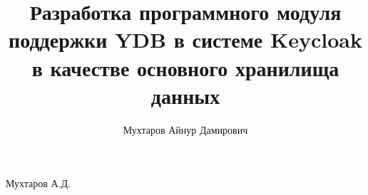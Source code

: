 \documentclass[times]{itmo-student-thesis}
\begin{document}
\title{Разработка программного модуля поддержки YDB в системе Keycloak в качестве основного хранилища данных}
\author{Мухтаров Айнур Дамирович}{Мухтаров А.Д.}
\startdate{}{}{}
\startdate{}{}{}








\end{document}

